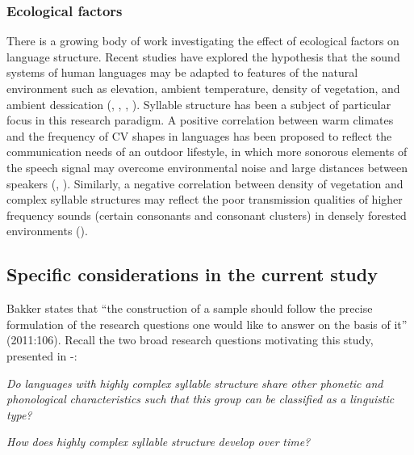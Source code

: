 \subsubsection{{Ecological} {factors}}\label{sec:2.1.2.3}

  There is a growing body of work investigating the effect of ecological factors on language structure. Recent studies have explored the hypothesis that the sound systems of human languages may be adapted to features of the natural environment such as elevation, ambient temperature, density of vegetation, and ambient dessication (\citealt{Everett2013}, \citealt{MaddiesonCoupé2015}, \citealt{EverettEtAl2016}, \citealt{Everett2017}). Syllable structure has been a subject of particular focus in this research paradigm. A positive correlation between warm climates and the frequency of CV shapes in languages has been proposed to reflect the communication needs of an outdoor lifestyle, in which more sonorous elements of the speech signal may overcome environmental noise and large distances between speakers (\citealt{MunroeEtAl1996}, \citealt{FoughtEtAl2004}). Similarly, a negative correlation between density of vegetation and complex syllable structures may reflect the poor transmission qualities of higher frequency sounds (certain consonants and consonant clusters) in densely forested environments (\citealt{MaddiesonCoupé2015}).

\subsection{Specific considerations in the current study}\label{sec:2.1.3}

  Bakker states that “the construction of a sample should follow the precise formulation of the research questions one would like to answer on the basis of it” (2011:106). Recall the two broad research questions motivating this study, presented in -:

\ea\label{ex:(2.1)}
   \textit{Do} \textit{languages} \textit{with} \textit{highly} \textit{complex} \textit{syllable} \textit{structure} \textit{share} \textit{other} \textit{phonetic} \textit{and} \textit{phonological} \textit{characteristics} \textit{such} \textit{that} \textit{this} \textit{group} \textit{can} \textit{be} \textit{classified} \textit{as} \textit{a} \textit{linguistic} \textit{type?}
\z

\ea\label{ex:(2.2)}
   \textit{How} \textit{does} \textit{highly} \textit{complex} \textit{syllable} \textit{structure} \textit{develop} \textit{over} \textit{time?}
\z

